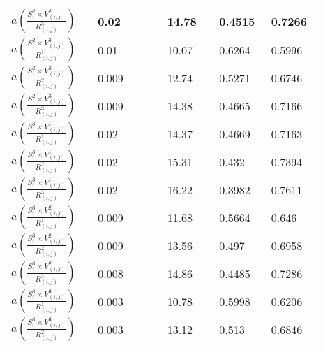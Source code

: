 \documentclass[10pt]{article}
\begin{document}
\begin{center}
\begin{table}[H]
\begin{center}
\begin{adjustbox}{width=0.5\textwidth}
\begin{tabular}{|p{0.25\linewidth}|p{0.2\linewidth}|p{0.15\linewidth}|p{0.15\linewidth}|p{0.15\linewidth}|}
\hline
$a(  \frac{S_{i}^2 \times V_{(i,j)}^2}{R_{(i,j)}^3})$ & 0.02 & 14.78 & 0.4515 & 0.7266 \\
\hline
 $a(  \frac{S_{i}^2 \times V_{(i,j)}^3}{R_{(i,j)}^1})$ &  0.01 & 10.07 & 0.6264 &  0.5996 \\
\hline
 $a(  \frac{S_{i}^2 \times V_{(i,j)}^3}{R_{(i,j)}^2})$ & 0.009 & 12.74 & 0.5271 & 0.6746 \\
\hline
 $a(  \frac{S_{i}^2 \times V_{(i,j)}^3}{R_{(i,j)}^3})$ & 0.009 & 14.38 & 0.4665 & 0.7166\\
\hline
 $a(  \frac{S_{i}^3 \times V_{(i,j)}^1}{R_{(i,j)}^1})$ & 0.02 & 14.37 & 0.4669 & 0.7163 \\
\hline
 $a(  \frac{S_{i}^3 \times V_{(i,j)}^1}{R_{(i,j)}^2})$ & 0.02 & 15.31 & 0.432 & 0.7394 \\
\hline
 $a(  \frac{S_{i}^3 \times V_{(i,j)}^1}{R_{(i,j)}^3})$ & 0.02 & 16.22 & 0.3982 & 0.7611 \\
\hline
$a(  \frac{S_{i}^3 \times V_{(i,j)}^2}{R_{(i,j)}^1})$ & 0.009 & 11.68 & 0.5664 & 0.646 \\
\hline
$a(  \frac{S_{i}^3 \times V_{(i,j)}^2}{R_{(i,j)}^2})$ & 0.009 & 13.56 & 0.497 & 0.6958\\
\hline
 $a(  \frac{S_{i}^3 \times V_{(i,j)}^2}{R_{(i,j)}^3})$ & 0.008 & 14.86 & 0.4485 & 0.7286 \\
\hline
 $a(  \frac{S_{i}^3 \times V_{(i,j)}^3}{R_{(i,j)}^1})$ & 0.003 & 10.78 & 0.5998 & 0.6206 \\
\hline
$a(  \frac{S_{i}^3 \times V_{(i,j)}^3}{R_{(i,j)}^2})$ & 0.003 & 13.12 & 0.513 & 0.6846 \\
\hline
\end{tabular}
\end{adjustbox}
\end{center}
\end{table}
\end{center} 
\end{document}
